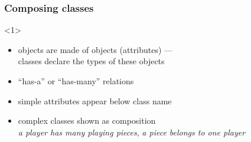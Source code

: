 \documentclass{slides}
\begin{document}
\begin{frame}
    \frametitle{Composing classes}

  \begin{center}
  \end{center}

  \begin{onlyenv}<1>
    \begin{itemize}
    \item objects are made of objects (\alert{attributes}) ---\\
      classes declare the types of these objects
    \item ``has-a'' or ``has-many'' relations
    \item simple attributes appear below class name
    \item complex classes shown as \alert{composition}\\
      \emph{a player has many playing pieces},
      \emph{a piece belongs to one player}
    \end{itemize}
  \end{onlyenv}

\end{frame}
\end{document}

